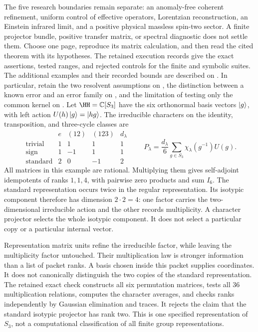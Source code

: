 The five research boundaries remain separate: an anomaly-free coherent refinement, uniform control of effective operators, Lorentzian reconstruction, an Einstein infrared limit, and a positive physical massless spin-two sector. A finite projector bundle, positive transfer matrix, or spectral diagnostic does not settle them.
Choose one page, reproduce its matrix calculation, and then read the cited theorem with its hypotheses. The retained execution records give the exact assertions, tested ranges, and rejected controls for the finite and symbolic suites. The additional examples and their recorded bounds are described on . In particular, retain the two resolvent assumptions on , the distinction between a known error and an error family on , and the limitation of testing only the common kernel on .
Let $\HH=\CC[S_3]$ have the six orthonormal basis vectors $\left|g\right\rangle$, with left action $U(h)\left|g\right\rangle=\left|hg\right\rangle$. The irreducible characters on the identity, transposition, and three-cycle classes are
\[
\begin{array}{c|rrr|r}
 & e & (12)&(123)&d_\lambda\\\hline
\text{trivial}&1&1&1&1\\
\text{sign}&1&-1&1&1\\
\text{standard}&2&0&-1&2
\end{array}
\qquad
P_\lambda=\frac{d_\lambda}{6}\sum_{g\in S_3}\chi_\lambda(g^{-1})U(g).
\]
All matrices in this example are rational. Multiplying them gives self-adjoint idempotents of ranks $1,1,4$, with pairwise zero products and sum $I_6$.
The standard representation occurs twice in the regular representation. Its isotypic component therefore has dimension $2\cdot2=4$: one factor carries the two-dimensional irreducible action and the other records multiplicity. A character projector selects the whole isotypic component. It does not select a particular copy or a particular internal vector.

Representation matrix units refine the irreducible factor, while leaving the multiplicity factor untouched. Their multiplication law is stronger information than a list of packet ranks. A basis chosen inside this packet supplies coordinates. It does not canonically distinguish the two copies of the standard representation.
The retained exact check constructs all six permutation matrices, tests all $36$ multiplication relations, computes the character averages, and checks ranks independently by Gaussian elimination and traces. It rejects the claim that the standard isotypic projector has rank two. This is one specified representation of $S_3$, not a computational classification of all finite group representations.

